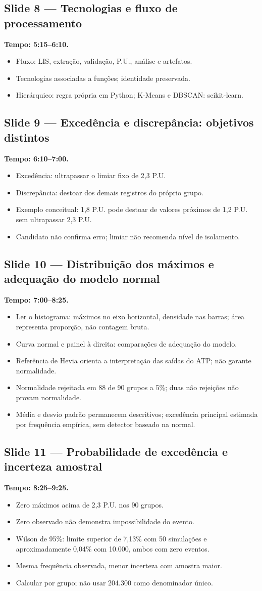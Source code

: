 \documentclass[11pt,a4paper]{article}
\newcommand{\slide}[3]{\Needspace{8\baselineskip}
  \subsection*{Slide #1 --- #2}
  \textbf{Tempo: #3.}\par}
\begin{document}
\slide{8}{Tecnologias e fluxo de processamento}{5:15--6:10}
\begin{itemize}
\item Fluxo: LIS, extração, validação, P.U., análise e artefatos.
\item Tecnologias associadas a funções; identidade preservada.
\item Hierárquico: regra própria em Python; K-Means e DBSCAN: scikit-learn.
\end{itemize}

\slide{9}{Excedência e discrepância: objetivos distintos}{6:10--7:00}
\begin{itemize}
\item Excedência: ultrapassar o limiar fixo de 2,3 P.U.
\item Discrepância: destoar dos demais registros do próprio grupo.
\item Exemplo conceitual: 1,8 P.U. pode destoar de valores próximos de
1,2 P.U. sem ultrapassar 2,3 P.U.
\item Candidato não confirma erro; limiar não recomenda nível de isolamento.
\end{itemize}

\slide{10}{Distribuição dos máximos e adequação do modelo normal}{7:00--8:25}
\begin{itemize}
\item Ler o histograma: máximos no eixo horizontal, densidade nas barras;
área representa proporção, não contagem bruta.
\item Curva normal e painel à direita: comparações de adequação do modelo.
\item Referência de Hevia orienta a interpretação das saídas do ATP;
não garante normalidade.
\item Normalidade rejeitada em 88 de 90 grupos a 5\%; duas não rejeições
não provam normalidade.
\item Média e desvio padrão permanecem descritivos; excedência principal
estimada por frequência empírica, sem detector baseado na normal.
\end{itemize}

\slide{11}{Probabilidade de excedência e incerteza amostral}{8:25--9:25}
\begin{itemize}
\item Zero máximos acima de 2,3 P.U. nos 90 grupos.
\item Zero observado não demonstra impossibilidade do evento.
\item Wilson de 95\%: limite superior de 7,13\% com 50 simulações e
aproximadamente 0,04\% com 10.000, ambos com zero eventos.
\item Mesma frequência observada, menor incerteza com amostra maior.
\item Calcular por grupo; não usar 204.300 como denominador único.
\end{itemize}
\end{document}

